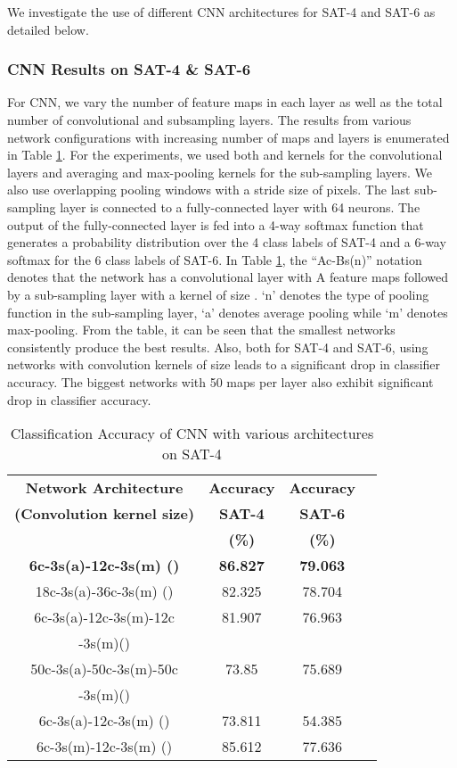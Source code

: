 \documentclass[11pt,a4paper]{article}
\begin{document}
We investigate the use of different CNN architectures for SAT-4 and SAT-6 as detailed below.

\subsubsection{CNN Results on SAT-4 \& SAT-6}
For CNN, we vary the number of feature maps in each layer as well as the total number of convolutional and subsampling layers. The results from various network configurations with increasing number of maps and layers is enumerated in Table \ref{table:CNN_accuracy_SAT_4_and_SAT_6}. For the experiments, we used both  and  kernels for the convolutional layers and  averaging and max-pooling kernels for the sub-sampling layers. We also use overlapping pooling windows with a stride size of  pixels. The last sub-sampling layer is connected to a fully-connected layer with 64 neurons. The output of the fully-connected layer is fed into a 4-way softmax function that generates a probability distribution over the 4 class labels of SAT-4 and a 6-way softmax for the 6 class labels of SAT-6. In Table \ref{table:CNN_accuracy_SAT_4_and_SAT_6}, the ``Ac-Bs(n)'' notation denotes that the network has a convolutional layer with A feature maps followed by a sub-sampling layer with a kernel of size . `n' denotes the type of pooling function in the sub-sampling layer, `a' denotes average pooling while `m' denotes max-pooling. From the table, it can be seen that the smallest networks consistently produce the best results. Also, both for SAT-4 and SAT-6, using networks with convolution kernels of size  leads to a significant drop in classifier accuracy. The biggest networks with 50 maps per layer also exhibit significant drop in classifier accuracy.   

\begin{table}[h!]
\centering
\begin{tabular}{ | c | c | c | c |}
    \hline
    \textbf{Network Architecture} & \textbf{Accuracy} & \textbf{Accuracy}\\   
     \textbf{(Convolution kernel size)} & \textbf{SAT-4} & \textbf{SAT-6} \\ 
     &\textbf{(\%)} & \textbf{(\%)}\\ \hline
    \textbf{6c-3s(a)-12c-3s(m) ()} & \textbf{86.827} & \textbf{79.063} \\ \hline
    18c-3s(a)-36c-3s(m) () & 82.325 & 78.704\\ \hline
    6c-3s(a)-12c-3s(m)-12c & 81.907  & 76.963\\ 
    -3s(m)() & &\\ \hline
    50c-3s(a)-50c-3s(m)-50c & 73.85 & 75.689 \\ 
    -3s(m)() & &\\ \hline
    6c-3s(a)-12c-3s(m) () & 73.811  & 54.385 \\ \hline
    6c-3s(m)-12c-3s(m) () & 85.612  & 77.636 \\ \hline
  \end{tabular}
  \caption{Classification Accuracy of CNN with various architectures on SAT-4}
  \label{table:CNN_accuracy_SAT_4_and_SAT_6}
\end{table}     
\end{document}
